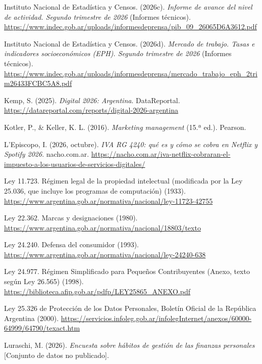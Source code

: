 \begin{CSLReferences}{1}{0}
Instituto Nacional de Estadística y Censos. (2026c). \emph{Informe de
avance del nivel de actividad. Segundo trimestre de 2026} (Informes
técnicos).
\url{https://www.indec.gob.ar/uploads/informesdeprensa/pib_09_26065D6A3612.pdf}

Instituto Nacional de Estadística y Censos. (2026d). \emph{Mercado de
trabajo. Tasas e indicadores socioeconómicos (EPH). Segundo trimestre de
2026} (Informes técnicos).
\url{https://www.indec.gob.ar/uploads/informesdeprensa/mercado_trabajo_eph_2trim26433FCBC5A8.pdf}

Kemp, S. (2025). \emph{Digital 2026: Argentina}. DataReportal.
\url{https://datareportal.com/reports/digital-2026-argentina}

Kotler, P., \& Keller, K. L. (2016). \emph{Marketing management} (15.ª
ed.). Pearson.

L'Episcopo, I. (2026, octubre). \emph{IVA RG 4240: qué es y cómo se
cobra en Netflix y Spotify 2026}. nacho.com.ar.
\url{https://nacho.com.ar/iva-netflix-cobraran-el-impuesto-a-los-usuarios-de-servicios-digitales/}

Ley 11.723. Régimen legal de la propiedad intelectual (modificada por la
Ley 25.036, que incluye los programas de computación) (1933).
\url{https://www.argentina.gob.ar/normativa/nacional/ley-11723-42755}

Ley 22.362. Marcas y designaciones (1980).
\url{https://www.argentina.gob.ar/normativa/nacional/18803/texto}

Ley 24.240. Defensa del consumidor (1993).
\url{https://www.argentina.gob.ar/normativa/nacional/ley-24240-638}

Ley 24.977. Régimen Simplificado para Pequeños Contribuyentes (Anexo,
texto según Ley 26.565) (1998).
\url{https://biblioteca.afip.gob.ar/pdfp/LEY25865_ANEXO.pdf}

Ley 25.326 de Protección de los Datos Personales, Boletín Oficial de la
República Argentina (2000).
\url{https://servicios.infoleg.gob.ar/infolegInternet/anexos/60000-64999/64790/texact.htm}

Luraschi, M. (2026). \emph{Encuesta sobre hábitos de gestión de las
finanzas personales} {[}Conjunto de datos no publicado{]}.


\end{CSLReferences}
